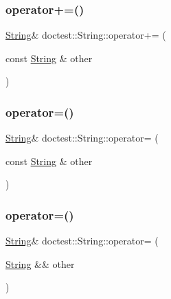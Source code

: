 \mbox{\label{classdoctest_1_1String_ad1df797f12cd140e3d1739f2b30b64d2}} 
\subsubsection{\texorpdfstring{operator+=()}{operator+=()}}
{\footnotesize\ttfamily \hyperlink{classdoctest_1_1String}{String}\& doctest\+::\+String\+::operator+= (\begin{DoxyParamCaption}\item[{const \hyperlink{classdoctest_1_1String}{String} \&}]{other }\end{DoxyParamCaption})}

\mbox{\label{classdoctest_1_1String_a1979700c536cfe9b5fecc328245f74ca}} 
\subsubsection{\texorpdfstring{operator=()}{operator=()}\hspace{0.1cm}{\footnotesize\ttfamily [1/2]}}
{\footnotesize\ttfamily \hyperlink{classdoctest_1_1String}{String}\& doctest\+::\+String\+::operator= (\begin{DoxyParamCaption}\item[{const \hyperlink{classdoctest_1_1String}{String} \&}]{other }\end{DoxyParamCaption})}

\mbox{\label{classdoctest_1_1String_a6099dbedeb150eb5659c7aa5dcea1727}} 
\subsubsection{\texorpdfstring{operator=()}{operator=()}\hspace{0.1cm}{\footnotesize\ttfamily [2/2]}}
{\footnotesize\ttfamily \hyperlink{classdoctest_1_1String}{String}\& doctest\+::\+String\+::operator= (\begin{DoxyParamCaption}\item[{\hyperlink{classdoctest_1_1String}{String} \&\&}]{other }\end{DoxyParamCaption})}

